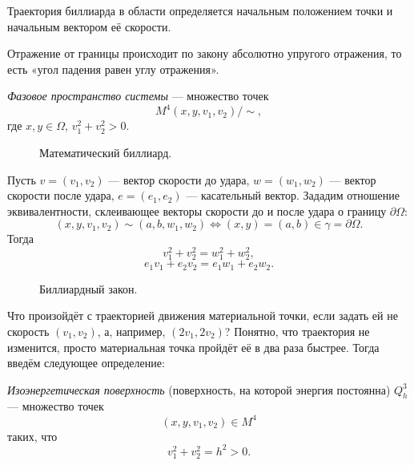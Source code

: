 \begin{remark}
    Траектория биллиарда в области определяется начальным положением точки и начальным вектором её скорости.
\end{remark}


\begin{remark}
    Отражение от границы происходит по закону абсолютно упругого отражения, то есть «угол падения равен углу отражения».
\end{remark}

\begin{definition}
    \textit{Фазовое пространство системы} — множество точек 
    $$M^4(x,y,v_1,v_2) / \sim,$$
    где $x,y \in \Omega$, $v_1^2+v_2^2 > 0.$
\end{definition} 

\begin{figure}[ht]
    \centering
    \caption{Математический биллиард.}
    \label{fig:c15.1}
\end{figure}


Пусть $v = (v_1,v_2)$ — вектор скорости до удара, $w = (w_1,w_2)$ — вектор скорости после удара, $e = (e_1,e_2)$ — касательный вектор. Зададим отношение эквивалентности, склеивающее векторы скорости до и после удара о границу $\partial \Omega$:
\[(x,y,v_1,v_2) \sim (a,b,w_1,w_2) \Longleftrightarrow (x,y) = (a,b) \in \gamma = \partial \Omega.\]
Тогда
\[v_1^2 + v_2^2 = w_1^2 + w_2^2,\]
\[e_1v_1 + e_2v_2 = e_1w_1 + e_2w_2.\]
\begin{figure}[ht]
    \centering
    \caption{Биллиардный закон.}
    \label{fig:c15.2}
\end{figure}

Что произойдёт с траекторией движения материальной точки, если задать ей не скорость $(v_1,v_2)$, а, например, $(2v_1, 2v_2)$? Понятно, что траектория не изменится, просто материальная точка пройдёт её в два раза быстрее. Тогда введём следующее определение:

\begin{definition}
    \textit{Изоэнергетическая поверхность} (поверхность, на которой энергия постоянна) $Q_h^3$ — множество точек 
    \[(x,y,v_1,v_2) \in M^4\]
    таких, что 
    \[v_1^2+v_2^2 = h^2 > 0.\]
\end{definition} 

